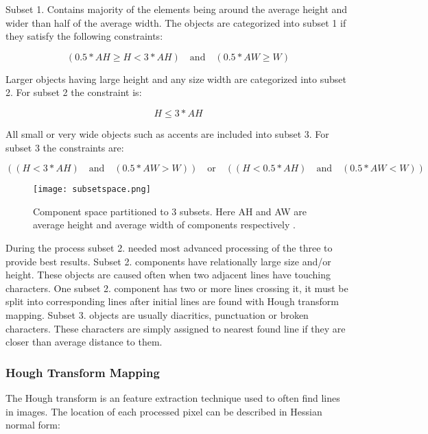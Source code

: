 \documentclass{article}
\begin{document}
            Subset 1. Contains majority of the elements being around the average height and wider than half of the average width. The objects are categorized into subset 1 if they satisfy the following constraints:

            \begin{equation}
              (0.5*AH \geq H < 3*AH) \quad \textrm{and} \quad (0.5*AW \geq W)
            \end{equation}

            Larger objects having large height and any size width are categorized into subset 2. For subset 2 the constraint is:

            \begin{equation}
              H \leq 3*AH
            \end{equation}

            All small or very wide objects such as accents are included into subset 3. For subset 3 the constraints are:

            \begin{equation}
              ((H < 3*AH)\quad \textrm{and} \quad (0.5*AW > W)) \quad \textrm{or} \quad((H < 0.5*AH)\quad \textrm{and} \quad(0.5*AW < W))
            \end{equation}


            \begin{figure}[!ht]
              \centering
              \texttt{[image: subsetspace.png]}
              \caption{Component space partitioned to 3 subsets. Here AH and AW are average height and average width of components respectively \cite{Louloudis1}. \label{fig:subsetspace}}
            \end{figure}

            During the process subset 2. needed most advanced processing of the three to provide best results. Subset 2. components have relationally large size and/or height. These objects are caused often when two adjacent lines have touching characters. One subset 2. component has two or more lines crossing it, it must be split into corresponding lines after initial lines are found with Hough transform mapping. Subset 3. objects are usually diacritics, punctuation or broken characters. These characters are simply assigned to nearest found line if they are closer than average distance to them.

          \subsubsection{Hough Transform Mapping}
          \label{sec:houghtransformmapping}
            The Hough transform is an feature extraction technique used to often find lines in images. The location of each processed pixel can be described in Hessian normal form:
\end{document}
